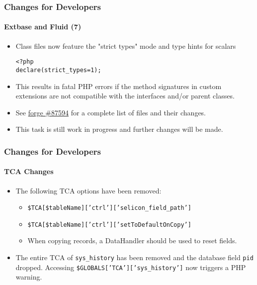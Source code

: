 \begin{frame}[fragile]
	\frametitle{Changes for Developers}
	\framesubtitle{Extbase and Fluid (7)}

	\lstset{basicstyle=\smaller\ttfamily}

	\begin{itemize}
		\item Class files now feature the "strict types" mode and type hints for scalars

\begin{lstlisting}
<?php
declare(strict_types=1);
\end{lstlisting}

		\item This results in fatal PHP errors if the method signatures in custom
			extensions are not compatible with the interfaces and/or parent classes.

		\item See \href{https://forge.typo3.org/issues/87594}{forge \#87594}
			for a complete list of files and their changes.

		\item This task is still work in progress and further changes will be made.

	\end{itemize}

\end{frame}


\begin{frame}[fragile]
	\frametitle{Changes for Developers}
	\framesubtitle{TCA Changes}

	\begin{itemize}
		\item The following TCA options have been removed:

			\begin{itemize}
				\item \texttt{\$TCA[\$tableName]['ctrl']['selicon\_field\_path']}
				\item \texttt{\$TCA[\$tableName]['ctrl']['setToDefaultOnCopy']}
			\end{itemize}

			\begin{itemize}\smaller
				\item[\ding{228}] When copying records, a DataHandler should be used to reset fields.
			\end{itemize}\normalsize

		\item The entire TCA of \texttt{sys\_history} has been removed and the database field \texttt{pid} dropped.
			Accessing \texttt{\$GLOBALS['TCA']['sys\_history']} now triggers a PHP warning.

	\end{itemize}

\end{frame}

